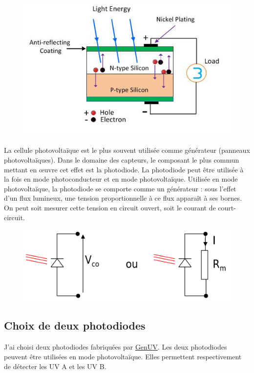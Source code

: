 \documentclass{article}
\begin{document}
    \begin{figure}[H]
        \centering
        \includegraphics[width=0.5\linewidth]{./images/solar-cell.jpg}
    \end{figure}

    \paragraph{}
    La cellule photovoltaïque est le plus souvent utilisée comme générateur (panneaux photovoltaïques). Dans le domaine des capteurs, le composant le plus commun mettant en \oe uvre cet effet est la photodiode. La photodiode peut être utilisée à la fois en mode photoconducteur et en mode photovoltaïque. Utilisée en mode photovoltaïque, la photodiode se comporte comme un générateur : sous l'effet d'un flux lumineux, une tension proportionnelle à ce flux apparaît à ses bornes. On peut soit mesurer cette tension en circuit ouvert, soit le courant de court-circuit.

    \begin{figure}[H]
        \centering
        \includegraphics[width=0.4\linewidth]{./images/photodiode-photovltaique.png}
    \end{figure}

    \subsection{Choix de deux photodiodes}
    \paragraph{}
    J'ai choisi deux photodiodes fabriquées par \href{http://www.geni-uv.com/index.php}{GenUV}. Les deux photodiodes peuvent être utilisées en mode photovoltaïque. Elles permettent respectivement de détecter les UV A et les UV B.
\end{document}
